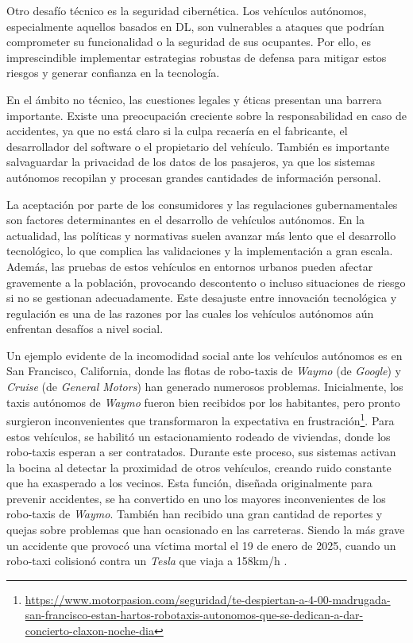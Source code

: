 Otro desafío técnico es la seguridad cibernética. Los vehículos autónomos, especialmente aquellos basados en \ac{DL}, son vulnerables a ataques que podrían comprometer su funcionalidad o la seguridad de sus ocupantes. Por ello, es imprescindible implementar estrategias robustas de defensa para mitigar estos riesgos y generar confianza en la tecnología.

En el ámbito no técnico, las cuestiones legales y éticas presentan una barrera importante. Existe una preocupación creciente sobre la responsabilidad en caso de accidentes, ya que no está claro si la culpa recaería en el fabricante, el desarrollador del software o el propietario del vehículo. También es importante salvaguardar la privacidad de los datos de los pasajeros, ya que los sistemas autónomos recopilan y procesan grandes cantidades de información personal.

La aceptación por parte de los consumidores y las regulaciones gubernamentales son factores determinantes en el desarrollo de vehículos autónomos. En la actualidad, las políticas y normativas suelen avanzar más lento que el desarrollo tecnológico, lo que complica las validaciones y la implementación a gran escala. Además, las pruebas de estos vehículos en entornos urbanos pueden afectar gravemente a la población, provocando descontento o incluso situaciones de riesgo si no se gestionan adecuadamente. Este desajuste entre innovación tecnológica y regulación es una de las razones por las cuales los vehículos autónomos aún enfrentan desafíos a nivel social.

Un ejemplo evidente de la incomodidad social ante los vehículos autónomos es en San Francisco, California, donde las flotas de robo-taxis de \textit{Waymo} (de \textit{Google}) y \textit{Cruise} (de \textit{General Motors}) han generado numerosos problemas. Inicialmente, los taxis autónomos de \textit{Waymo} fueron bien recibidos por los habitantes, pero pronto surgieron inconvenientes que transformaron la expectativa en frustración\footnote{\url{https://www.motorpasion.com/seguridad/te-despiertan-a-4-00-madrugada-san-francisco-estan-hartos-robotaxis-autonomos-que-se-dedican-a-dar-concierto-claxon-noche-dia}}. Para estos vehículos, se habilitó un estacionamiento rodeado de viviendas, donde los robo-taxis esperan a ser contratados. Durante este proceso, sus sistemas activan la bocina al detectar la proximidad de otros vehículos, creando ruido constante que ha exasperado a los vecinos. Esta función, diseñada originalmente para prevenir accidentes, se ha convertido en uno los mayores inconvenientes de los robo-taxis de \textit{Waymo}. También han recibido una gran cantidad de reportes y quejas sobre problemas que han ocasionado en las carreteras. Siendo la más grave un accidente que provocó una víctima mortal el 19 de enero de 2025, cuando un robo-taxi colisionó contra un \textit{Tesla} que viaja a 158km/h \cite{waymo-wiki}.

